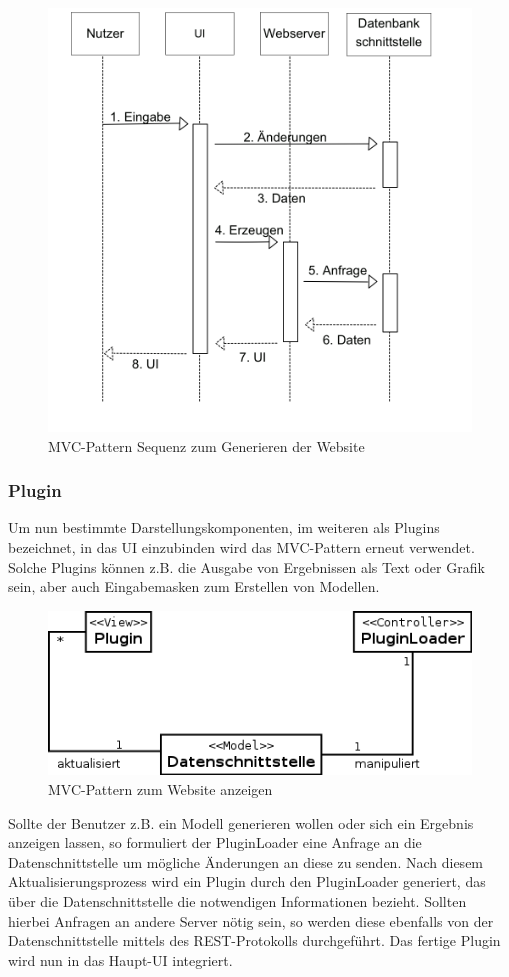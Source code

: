 \begin{figure}[h]
\centering
\includegraphics[width=0.6\linewidth]{Grafik/Diagramm/Pattern/MVC/Website/Sequenzdiagramm.png}
\caption[MVC Website Sequenz]{MVC-Pattern Sequenz zum Generieren der Website}
\end{figure}


\clearpage

\subsubsection{Plugin}
Um nun bestimmte Darstellungskomponenten, im weiteren als Plugins bezeichnet, in das UI einzubinden wird das MVC-Pattern erneut verwendet. Solche Plugins können z.B. die Ausgabe von Ergebnissen als Text oder Grafik sein, aber auch Eingabemasken zum Erstellen von Modellen.


\begin{figure}[h]
\centering
\includegraphics[width=1.0\linewidth]{Grafik/Diagramm/Pattern/MVC/Plugin/Kontextdiagramm.png}
\caption[MVC Website Klassen]{MVC-Pattern zum Website anzeigen}
\end{figure}

\noindent Sollte der Benutzer z.B. ein Modell generieren wollen oder sich ein Ergebnis anzeigen lassen, so formuliert der PluginLoader eine Anfrage an die Datenschnittstelle um mögliche Änderungen an diese zu senden. Nach diesem Aktualisierungsprozess wird ein Plugin durch den PluginLoader generiert, das über die Datenschnittstelle die notwendigen Informationen bezieht. Sollten hierbei Anfragen an andere Server nötig sein, so werden diese ebenfalls von der Datenschnittstelle mittels des REST-Protokolls durchgeführt. 
Das fertige Plugin wird nun in das Haupt-UI integriert.


